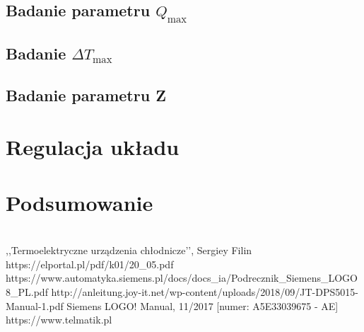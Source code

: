 \documentclass[oneside]{mgr}
\begin{document}
\section{Badanie parametru $Q_{\max}$}
\section{Badanie $\Delta T_{\max}$}
\section{Badanie parametru Z}
\chapter{Regulacja układu}
\chapter{Podsumowanie}



\begin{thebibliography} 
\\
,,Termoelektryczne urządzenia chłodnicze’’, Sergiey Filin
https://elportal.pl/pdf/k01/20\_05.pdf
https://www.automatyka.siemens.pl/docs/docs\_ia/Podrecznik\_Siemens\_LOGO8\_PL.pdf
http://anleitung.joy-it.net/wp-content/uploads/2018/09/JT-DPS5015-Manual-1.pdf
Siemens LOGO! Manual, 11/2017 [numer: A5E33039675 - AE]
https://www.telmatik.pl
\end{thebibliography}

\listoffigures
\listoftables
\end{document}
